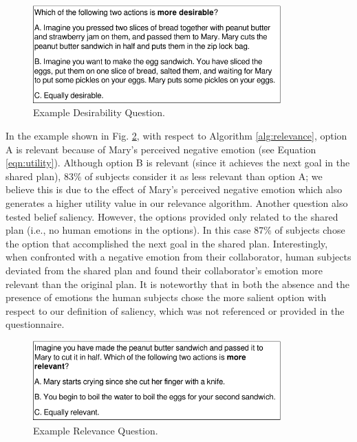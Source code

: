 \documentclass[12pt]{report}
\begin{document}
\begin{figure}[tbh]
  \vspace{-4mm}
  \centering
  \includegraphics[width=0.85\textwidth]{figure/question-sample3-croped.pdf}
  \caption{{\fontsize{9}{9}\selectfont Example Desirability Question.}}
  \label{fig:qs3}
  \vspace{-5mm}
\end{figure}

In the example shown in Fig. \ref{fig:qs4}, with respect to Algorithm
\ref{alg:relevance}, option A is relevant because of Mary's perceived negative
emotion (see Equation \ref{eqn:utility}). Although option B is relevant (since
it achieves the next goal in the shared plan), 83\% of subjects consider it as
less relevant than option A; we believe this is due to the effect of Mary's
perceived negative emotion which also generates a higher utility value in our
relevance algorithm. Another question also tested belief saliency. However, the
options provided only related to the shared plan (i.e., no human emotions in the
options). In this case 87\% of subjects chose the option that accomplished the
next goal in the shared plan. Interestingly, when confronted with a negative
emotion from their collaborator, human subjects deviated from the shared plan
and found their collaborator's emotion more relevant than the original plan. It
is noteworthy that in both the absence and the presence of emotions the human
subjects chose the more salient option with respect to our definition of
saliency, which was not referenced or provided in the questionnaire.

\begin{figure}[tbh]
  \centering
  \includegraphics[width=0.85\textwidth]{figure/question-sample4-croped.pdf}
  \caption{{\fontsize{9}{9}\selectfont Example Relevance Question.}}
  \label{fig:qs4}
  \vspace{-5mm}
\end{figure}
\end{document}
